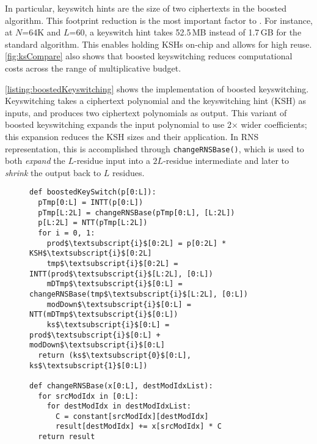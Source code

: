 In particular, keyswitch hints are the size of
two
ciphertexts in the boosted algorithm.
This footprint reduction is the most important factor to \name.
For instance, at $N$=64K and $L$=60,
a keyswitch hint takes 52.5\,MB
instead of 1.7\,GB for the standard algorithm.
This enables holding KSHs on-chip and allows for high reuse.
%
\autoref{fig:ksCompare} also shows that boosted keyswitching reduces computational
costs across the range of multiplicative budget.

\autoref{listing:boostedKeyswitching} shows the implementation of boosted keyswitching.
Keyswitching takes a ciphertext polynomial and the keyswitching hint (KSH) as inputs,
and %
produces two ciphertext polynomials as output.
This variant of boosted keyswitching expands the input polynomial to use 2$\times$ wider coefficients;
this expansion reduces the KSH sizes and their application.
In RNS representation, this is accomplished through \verb!changeRNSBase()!,
which is used to both \emph{expand} the $L$-residue input into a $2L$-residue intermediate and later to \emph{shrink} the output
back to $L$ residues.



    \begin{figure}\label{lst:boostedKeyswitching}
      \begin{center}
          \begin{lstlisting}[caption={Boosted keyswitching implementation (1-digit).}, mathescape=true, label=listing:boostedKeyswitching]
def boostedKeySwitch(p[0:L]):
  pTmp[0:L] = INTT(p[0:L])
  pTmp[L:2L] = changeRNSBase(pTmp[0:L], [L:2L])
  p[L:2L] = NTT(pTmp[L:2L])
  for i = 0, 1:
    prod$\textsubscript{i}$[0:2L] = p[0:2L] * KSH$\textsubscript{i}$[0:2L]
    tmp$\textsubscript{i}$[0:2L] = INTT(prod$\textsubscript{i}$[L:2L], [0:L])
    mDTmp$\textsubscript{i}$[0:L] = changeRNSBase(tmp$\textsubscript{i}$[L:2L], [0:L])
    modDown$\textsubscript{i}$[0:L] = NTT(mDTmp$\textsubscript{i}$[0:L])
    ks$\textsubscript{i}$[0:L] = prod$\textsubscript{i}$[0:L] + modDown$\textsubscript{i}$[0:L]
  return (ks$\textsubscript{0}$[0:L], ks$\textsubscript{1}$[0:L])

def changeRNSBase(x[0:L], destModIdxList):
  for srcModIdx in [0:L]:
    for destModIdx in destModIdxList:
      C = constant[srcModIdx][destModIdx]
      result[destModIdx] += x[srcModIdx] * C
  return result
          \end{lstlisting}
        \end{center}
	\vspace{6pt}
      \end{figure}


